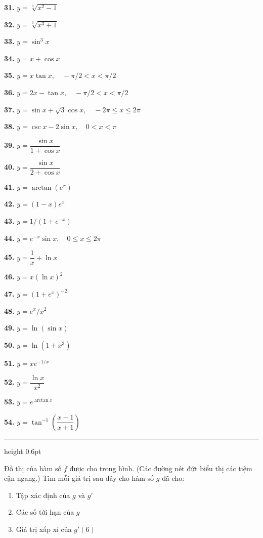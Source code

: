 \documentclass[10pt]{article}
\newcommand{\exrow}[3][0.32em]{%
  \noindent\parbox[t]{0.485\linewidth}{#2}\hfill\parbox[t]{0.485\linewidth}{#3}\par
  \vspace{#1}%
}
\newcommand{\exsingle}[2][0.32em]{%
  \noindent\parbox[t]{\linewidth}{#2}\par
  \vspace{#1}%
}
\begin{document}
\begin{minipage}[t]{0.485\textwidth}
  \vspace{0pt}
  \exrow{\textbf{31.} $y = \sqrt[3]{x^2 - 1}$}{\textbf{32.} $y = \sqrt[3]{x^3 + 1}$}
  \exrow{\textbf{33.} $y = \sin^3 x$}{\textbf{34.} $y = x + \cos x$}
  \exsingle{\textbf{35.} $y = x\tan x, \quad -\pi/2 < x < \pi/2$}
  \exsingle{\textbf{36.} $y = 2x - \tan x, \quad -\pi/2 < x < \pi/2$}
  \exsingle{\textbf{37.} $y = \sin x + \sqrt{3}\cos x, \quad -2\pi \le x \le 2\pi$}
  \exsingle{\textbf{38.} $y = \csc x - 2\sin x, \quad 0 < x < \pi$}
  \exrow[0.5em]{\textbf{39.} $y = \dfrac{\sin x}{1 + \cos x}$}{\textbf{40.} $y = \dfrac{\sin x}{2 + \cos x}$}
  \exrow{\textbf{41.} $y = \arctan(e^x)$}{\textbf{42.} $y = (1 - x)e^x$}
  \exsingle{\textbf{43.} $y = 1/(1 + e^{-x})$}
  \exsingle{\textbf{44.} $y = e^{-x}\sin x, \quad 0 \le x \le 2\pi$}
  \exrow[0.5em]{\textbf{45.} $y = \dfrac{1}{x} + \ln x$}{\textbf{46.} $y = x(\ln x)^2$}
  \exrow{\textbf{47.} $y = (1 + e^x)^{-2}$}{\textbf{48.} $y = e^x/x^2$}
  \exrow{\textbf{49.} $y = \ln(\sin x)$}{\textbf{50.} $y = \ln(1 + x^3)$}
  \exrow[0.5em]{\textbf{51.} $y = xe^{-1/x}$}{\textbf{52.} $y = \dfrac{\ln x}{x^2}$}
  \exrow[0.5em]{\textbf{53.} $y = e^{\arctan x}$}{\textbf{54.} $y = \tan^{-1}\left(\dfrac{x - 1}{x + 1}\right)$}

  \vspace{0.45em}
  {\color{stewartcyan}\hrule height 0.6pt}
  \vspace{0.45em}

  \quad Đồ thị của hàm số $f$ được cho trong hình. (Các đường nét đứt biểu thị các tiệm cận ngang.) Tìm mỗi giá trị sau đây cho hàm số $g$ đã cho:
  \begin{enumerate}[label=\textbf{(\alph*)}, itemsep=1pt, topsep=2pt, leftmargin=1.8em]
    \item Tập xác định của $g$ và $g'$
    \item Các số tới hạn của $g$
    \item Giá trị xấp xỉ của $g'(6)$
  \end{enumerate}
\end{minipage}
\end{document}
